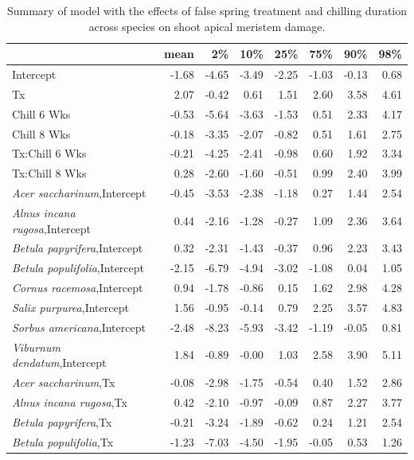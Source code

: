 \documentclass{article}\usepackage[]{graphicx}\usepackage[]{color}
\begin{document}
\newpage
\begin{longtable}{lrrrrrrr}
\caption{Summary of model with the effects of false spring treatment and chilling duration across species on shoot apical meristem damage.} \\ 
  \hline
 & mean & 2\% & 10\% & 25\% & 75\% & 90\% & 98\% \\ 
  \hline \endhead  \hline
Intercept & -1.68 & -4.65 & -3.49 & -2.25 & -1.03 & -0.13 & 0.68 \\ 
  Tx & 2.07 & -0.42 & 0.61 & 1.51 & 2.60 & 3.58 & 4.61 \\ 
  Chill 6 Wks & -0.53 & -5.64 & -3.63 & -1.53 & 0.51 & 2.33 & 4.17 \\ 
  Chill 8 Wks & -0.18 & -3.35 & -2.07 & -0.82 & 0.51 & 1.61 & 2.75 \\ 
  Tx:Chill 6 Wks & -0.21 & -4.25 & -2.41 & -0.98 & 0.60 & 1.92 & 3.34 \\ 
  Tx:Chill 8 Wks & 0.28 & -2.60 & -1.60 & -0.51 & 0.99 & 2.40 & 3.99 \\ 
  \textit{Acer saccharinum},Intercept & -0.45 & -3.53 & -2.38 & -1.18 & 0.27 & 1.44 & 2.54 \\ 
  \textit{Alnus incana rugosa},Intercept & 0.44 & -2.16 & -1.28 & -0.27 & 1.09 & 2.36 & 3.64 \\ 
  \textit{Betula papyrifera},Intercept & 0.32 & -2.31 & -1.43 & -0.37 & 0.96 & 2.23 & 3.43 \\ 
  \textit{Betula populifolia},Intercept & -2.15 & -6.79 & -4.94 & -3.02 & -1.08 & 0.04 & 1.05 \\ 
  \textit{Cornus racemosa},Intercept & 0.94 & -1.78 & -0.86 & 0.15 & 1.62 & 2.98 & 4.28 \\ 
  \textit{Salix purpurea},Intercept & 1.56 & -0.95 & -0.14 & 0.79 & 2.25 & 3.57 & 4.83 \\ 
  \textit{Sorbus americana},Intercept & -2.48 & -8.23 & -5.93 & -3.42 & -1.19 & -0.05 & 0.81 \\ 
  \textit{Viburnum dendatum},Intercept & 1.84 & -0.89 & -0.00 & 1.03 & 2.58 & 3.90 & 5.11 \\ 
  \textit{Acer saccharinum},Tx & -0.08 & -2.98 & -1.75 & -0.54 & 0.40 & 1.52 & 2.86 \\ 
  \textit{Alnus incana rugosa},Tx & 0.42 & -2.10 & -0.97 & -0.09 & 0.87 & 2.27 & 3.77 \\ 
  \textit{Betula papyrifera},Tx & -0.21 & -3.24 & -1.89 & -0.62 & 0.24 & 1.21 & 2.54 \\ 
  \textit{Betula populifolia},Tx & -1.23 & -7.03 & -4.50 & -1.95 & -0.05 & 0.53 & 1.26 \\ 

\end{longtable}
\end{document}
